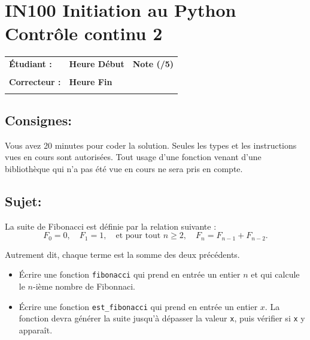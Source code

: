 \documentclass[a4paper,11pt]{article}
\begin{document}
\newpage

\section*{\center IN100 Initiation au Python\\
Contrôle continu 2}


\begin{table}[h!]
\centering
\renewcommand{\arraystretch}{1.4} %
\begin{tabular}{|p{10cm}|p{3cm}|p{2cm}|}
\hline
\textbf{Étudiant :} & \textbf{Heure Début }  & \textbf{Note (/5) }  \\
& & \\
\hline
\textbf{Correcteur :} & \textbf{Heure Fin } & \\
& & \\
\hline

\hline
\end{tabular}
\end{table}

\vspace*{-0.4 cm}
\subsection*{Consignes:} Vous avez 20 minutes pour coder la solution. Seules les types et les instructions vues en cours sont autorisées. Tout usage d'une fonction 
venant d'une bibliothèque qui n'a pas été vue en cours ne sera pris en compte. 

\vspace*{-0.2 cm}

\subsection*{Sujet:}   


La suite de Fibonacci est définie par la relation suivante :
\[
F_0 = 0, \quad F_1 = 1, \quad \text{et pour tout } n \ge 2, \quad F_n = F_{n-1} + F_{n-2}.
\]

Autrement dit, chaque terme est la somme des deux précédents.

\begin{itemize}
\item[1.] Écrire une fonction \texttt{fibonacci} qui prend en entrée un entier $n$ et qui calcule le $n$-ième nombre de Fibonnaci. 
\item[2.] Écrire une fonction  \texttt{est\_fibonacci}  qui prend en entrée un entier $x$. La fonction devra  générer la suite jusqu’à dépasser la valeur \texttt{x}, puis vérifier si \texttt{x} y apparaît.
\end{itemize}
\end{document}
